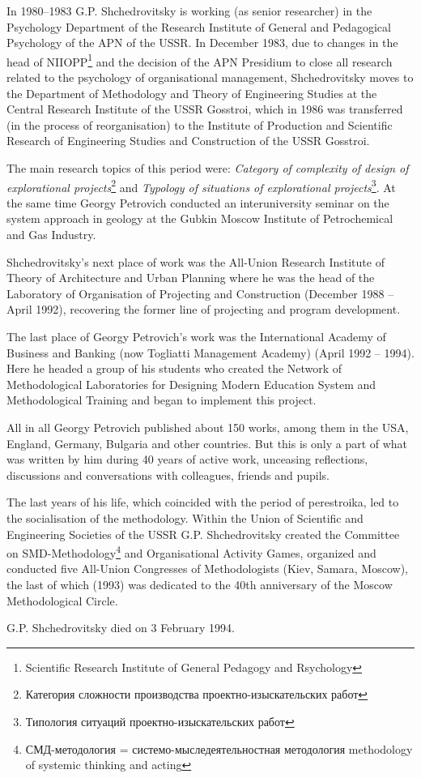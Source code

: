 \documentclass[a4paper,11pt]{article}
\begin{document}
In 1980--1983 G.P. Shchedrovitsky is working (as senior researcher) in the
Psychology Department of the Research Institute of General and Pedagogical
Psychology of the APN of the USSR. In December 1983, due to changes in the
head of NIIOPP\footnote{Scientific Research Institute of General Pedagogy and
  Rsychology} and the decision of the APN Presidium to close all research
related to the psychology of organisational management, Shchedrovitsky moves
to the Department of Methodology and Theory of Engineering Studies at the
Central Research Institute of the USSR Gosstroi, which in 1986 was transferred
(in the process of reorganisation) to the Institute of Production and
Scientific Research of Engineering Studies and Construction of the USSR
Gosstroi.

The main research topics of this period were: \emph{Category of complexity of
  design of explorational
  projects}\footnote{\foreignlanguage{russian}{Категория сложности
    производства проектно-изыскательских работ}} and \emph{Typology of
  situations of explorational
  projects}\footnote{\foreignlanguage{russian}{Типология ситуаций
    проектно-изыскательских работ}}. At the same time Georgy Petrovich
conducted an interuniversity seminar on the system approach in geology at the
Gubkin Moscow Institute of Petrochemical and Gas Industry.

Shchedrovitsky's next place of work was the All-Union Research Institute of
Theory of Architecture and Urban Planning where he was the head of the
Laboratory of Organisation of Projecting and Construction (December 1988 --
April 1992), recovering the former line of projecting and program development.

The last place of Georgy Petrovich's work was the International Academy of
Business and Banking (now Togliatti Management Academy) (April 1992 -- 1994).
Here he headed a group of his students who created the Network of
Methodological Laboratories for Designing Modern Education System and
Methodological Training and began to implement this project.

All in all Georgy Petrovich published about 150 works, among them in the USA,
England, Germany, Bulgaria and other countries. But this is only a part of
what was written by him during 40 years of active work, unceasing reflections,
discussions and conversations with colleagues, friends and pupils.

The last years of his life, which coincided with the period of perestroika,
led to the socialisation of the methodology. Within the Union of Scientific
and Engineering Societies of the USSR G.P. Shchedrovitsky created the
Committee on
SMD-Methodology\footnote{\foreignlanguage{russian}{СМД-методология =
    системо-мыследеятельностная методология} methodology of systemic thinking
  and acting} and Organisational Activity Games, organized and conducted five
All-Union Congresses of Methodologists (Kiev, Samara, Moscow), the last of
which (1993) was dedicated to the 40th anniversary of the Moscow
Methodological Circle.

G.P. Shchedrovitsky died on 3 February 1994.
\end{document}
